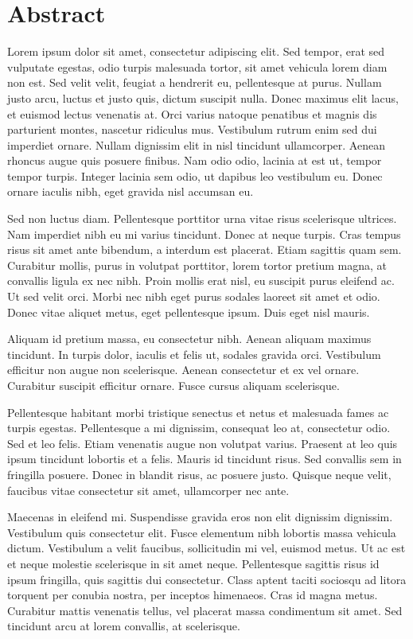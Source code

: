 \cleardoublepage
\chapter*{Abstract}

Lorem ipsum dolor sit amet, consectetur adipiscing elit. Sed tempor, erat sed vulputate egestas, odio turpis malesuada tortor, sit amet vehicula lorem diam non est. Sed velit velit, feugiat a hendrerit eu, pellentesque at purus. Nullam justo arcu, luctus et justo quis, dictum suscipit nulla. Donec maximus elit lacus, et euismod lectus venenatis at. Orci varius natoque penatibus et magnis dis parturient montes, nascetur ridiculus mus. Vestibulum rutrum enim sed dui imperdiet ornare. Nullam dignissim elit in nisl tincidunt ullamcorper. Aenean rhoncus augue quis posuere finibus. Nam odio odio, lacinia at est ut, tempor tempor turpis. Integer lacinia sem odio, ut dapibus leo vestibulum eu. Donec ornare iaculis nibh, eget gravida nisl accumsan eu.

Sed non luctus diam. Pellentesque porttitor urna vitae risus scelerisque ultrices. Nam imperdiet nibh eu mi varius tincidunt. Donec at neque turpis. Cras tempus risus sit amet ante bibendum, a interdum est placerat. Etiam sagittis quam sem. Curabitur mollis, purus in volutpat porttitor, lorem tortor pretium magna, at convallis ligula ex nec nibh. Proin mollis erat nisl, eu suscipit purus eleifend ac. Ut sed velit orci. Morbi nec nibh eget purus sodales laoreet sit amet et odio. Donec vitae aliquet metus, eget pellentesque ipsum. Duis eget nisl mauris.

Aliquam id pretium massa, eu consectetur nibh. Aenean aliquam maximus tincidunt. In turpis dolor, iaculis et felis ut, sodales gravida orci. Vestibulum efficitur non augue non scelerisque. Aenean consectetur et ex vel ornare. Curabitur suscipit efficitur ornare. Fusce cursus aliquam scelerisque.

Pellentesque habitant morbi tristique senectus et netus et malesuada fames ac turpis egestas. Pellentesque a mi dignissim, consequat leo at, consectetur odio. Sed et leo felis. Etiam venenatis augue non volutpat varius. Praesent at leo quis ipsum tincidunt lobortis et a felis. Mauris id tincidunt risus. Sed convallis sem in fringilla posuere. Donec in blandit risus, ac posuere justo. Quisque neque velit, faucibus vitae consectetur sit amet, ullamcorper nec ante.

Maecenas in eleifend mi. Suspendisse gravida eros non elit dignissim dignissim. Vestibulum quis consectetur elit. Fusce elementum nibh lobortis massa vehicula dictum. Vestibulum a velit faucibus, sollicitudin mi vel, euismod metus. Ut ac est et neque molestie scelerisque in sit amet neque. Pellentesque sagittis risus id ipsum fringilla, quis sagittis dui consectetur. Class aptent taciti sociosqu ad litora torquent per conubia nostra, per inceptos himenaeos. Cras id magna metus. Curabitur mattis venenatis tellus, vel placerat massa condimentum sit amet. Sed tincidunt arcu at lorem convallis, at scelerisque. 